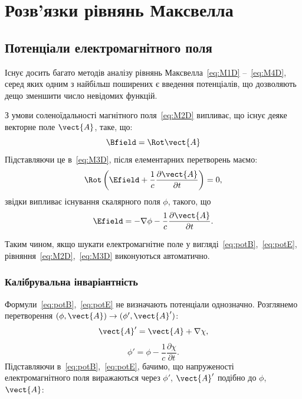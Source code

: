 
\chapter{Розв’язки рівнянь Максвелла}\label{\currfilebase}

\section{Потенціали електромагнітного поля}

Існує досить багато методів аналізу рівнянь Максвелла~\eqref{eq:M1D} --~\eqref{eq:M4D}, серед яких одним з найбільш поширених є введення потенціалів, що
дозволяють дещо
зменшити число невідомих функцій.

З умови соленоїдальності магнітного поля~\eqref{eq:M2D} випливає, що існує деяке векторне поле $\vect{A}$, таке, що:
\begin{equation}\label{eq:potB}
	 \Bfield = \Rot\vect{A}
\end{equation}
Підставляючи це в~\eqref{eq:M3D}, після елементарних перетворень маємо:
\begin{equation*}
	\Rot \left( \Efield + \frac{1}{c} \frac{\partial \vect{A}}{\partial t}\right)  = 0,
\end{equation*}
звідки випливає існування скалярного поля $\phi$, такого, що
\begin{equation}\label{eq:potE}
	\Efield = -\nabla \phi - \frac{1}{c} \frac{\partial \vect{A}}{\partial t}.
\end{equation}

Таким чином, якщо шукати електромагнітне поле у вигляді~\eqref{eq:potB},~\eqref{eq:potE}, рівняння~\eqref{eq:M2D},~\eqref{eq:M3D} виконуються
автоматично.

\subsection*{Калібрувальна інваріантність}

Формули~\eqref{eq:potB},~\eqref{eq:potE} не визначають потенціали однозначно. Розглянемо перетворення $(\phi, \vect{A}) \to (\phi', \vect{A}')$:
\begin{equation}\label{eq:A'}
	\vect{A}' = \vect{A} + \nabla \chi,
\end{equation}
\begin{equation}\label{eq:phi'}
	\phi' = \phi - \frac{1}{c} \frac{\partial \chi}{\partial t}.
\end{equation}
Підставляючи в~\eqref{eq:potB},~\eqref{eq:potE}, бачимо, що напруженості електромагнітного
поля виражаються через $\phi'$, $\vect{A}'$ подібно до $\phi$, $\vect{A}$:

